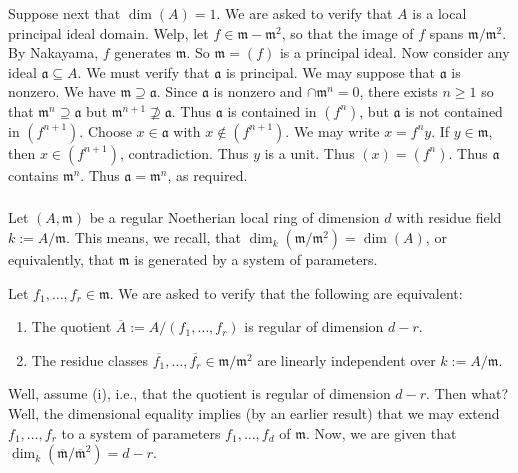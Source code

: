 \documentclass[10pt]{article}
\begin{document}
Suppose next that \(\dim(A) = 1\).
We are asked to verify that
\(A\) is a local principal ideal domain.
Welp,
let \(f \in \mathfrak{m} - \mathfrak{m}^2\),
so that the image of \(f\) spans \(\mathfrak{m}/\mathfrak{m}^2\).
By Nakayama, \(f\) generates \(\mathfrak{m}\).
So \(\mathfrak{m} = (f)\) is a principal ideal.
Now consider any ideal \(\mathfrak{a} \subseteq A\).
We must verify that \(\mathfrak{a}\) is principal.
We may suppose that \(\mathfrak{a}\) is nonzero.
We have \(\mathfrak{m} \supseteq \mathfrak{a}\).
Since \(\mathfrak{a}\) is nonzero and \(\cap \mathfrak{m}^n = 0\),
there exists \(n \geq 1\) so that \(\mathfrak{m}^n \supseteq
  \mathfrak{a}\)
but \(\mathfrak{m}^{n+1} \not\supseteq \mathfrak{a}\).
Thus \(\mathfrak{a}\) is contained in \((f^n)\),
but \(\mathfrak{a}\) is not contained in \((f^{n+1})\).
Choose \(x \in \mathfrak{a}\)
with \(x \notin (f^{n+1})\).
We may write \(x = f^n y\).
If \(y \in \mathfrak{m}\),
then \(x \in (f^{n+1})\), contradiction.
Thus \(y\) is a unit.
Thus \((x) = (f^n)\).
Thus \(\mathfrak{a}\) contains \(\mathfrak{m}^n\).
Thus \(\mathfrak{a} = \mathfrak{m}^n\), as required.



\subsubsection{}
\label{sec:org6abe4ac}

Let \((A,\mathfrak{m})\) be a regular Noetherian local ring of
dimension \(d\) with residue field \(k := A/\mathfrak{m}\).
This means,
we recall,
that \(\dim_k(\mathfrak{m}/\mathfrak{m}^2) = \dim(A)\),
or equivalently,
that \(\mathfrak{m}\) is generated by a system of parameters.

Let \(f_1,\dotsc,f_r \in \mathfrak{m}\).
We are asked to verify that the following are equivalent:
\begin{enumerate}
\item The quotient $\overline{A} := A / (f_1,\dotsc,f_r)$
  is regular of dimension $d-r$.
\item The residue classes $\overline{f_1}, \dotsc,
  \overline{f_r}
  \in \mathfrak{m} / \mathfrak{m}^2$
  are linearly independent over $k := A/\mathfrak{m}$.
\end{enumerate}
Well, assume (i), i.e.,
that the quotient is regular of dimension \(d-r\).
Then what?
Well, the dimensional equality
implies (by an earlier result) that
we may extend \(f_1,\dotsc,f_r\) to a system of parameters
\(f_1,\dotsc,f_d\) of \(\mathfrak{m}\).
Now, we are given
that \(\dim_{k}(\overline{\mathfrak{m} } / \overline{\mathfrak{m}
  }^2) = d - r\).
\end{document}
